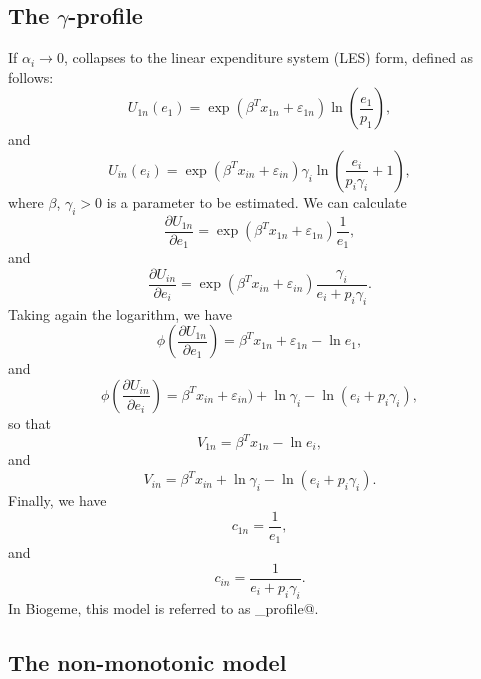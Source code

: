 \documentclass[12pt,a4paper]{article}
\begin{document}
\subsection{The $\gamma$-profile}
If $\alpha_i \to 0$,  collapses to the linear expenditure system (LES) form, defined as follows:
\begin{equation}
  \label{eq:u_les_outside}
U_{1n}(e_{1})= \exp(\beta^T x_{1n} + \varepsilon_{1n}) \ln \left(\frac{e_1}{p_1} \right),
\end{equation}
and
\begin{equation}
  \label{eq:u_les}
U_{in}(e_{i})= \exp(\beta^T x_{in} + \varepsilon_{in}) \gamma_i \ln \left(\frac{e_i}{p_i \gamma_i}+1 \right),
\end{equation}
where $\beta$, $\gamma_i > 0$ is a  parameter to be
estimated. We can calculate
\[
\frac{\partial U_{1n}}{\partial e_1} =  \exp(\beta^T x_{1n} + \varepsilon_{1n}) \frac{1}{e_1},
\]
and
\[
\frac{\partial U_{in}}{\partial e_i} =  \exp(\beta^T x_{in} + \varepsilon_{in}) \frac{\gamma_i}{e_i + p_i \gamma_i}.
\]
Taking again the logarithm, we have
\[
\phi\left(\frac{\partial U_{1n}}{\partial e_1}\right) =\beta^T x_{1n} + \varepsilon_{1n} - \ln e_1,
\]
and
\[
\phi\left(\frac{\partial U_{in}}{\partial e_i}\right) =\beta^T x_{in} + \varepsilon_{in}) + \ln \gamma_i - \ln(e_i + p_i \gamma_i),
\]
so that
\[
V_{1n} = \beta^T x_{1n}  - \ln e_i,
\]
and
\[
V_{in} = \beta^T x_{in} + \ln \gamma_i - \ln(e_i + p_i \gamma_i).
\]
Finally, we have
\[
c_{1n} = \frac{1}{e_1},
\]
and
\[
c_{in} = \frac{1}{e_i + p_i \gamma_i}.
\]
In Biogeme, this model is referred to as \lstinline@gamma_profile@.

\subsection{The non-monotonic model}
\end{document}

